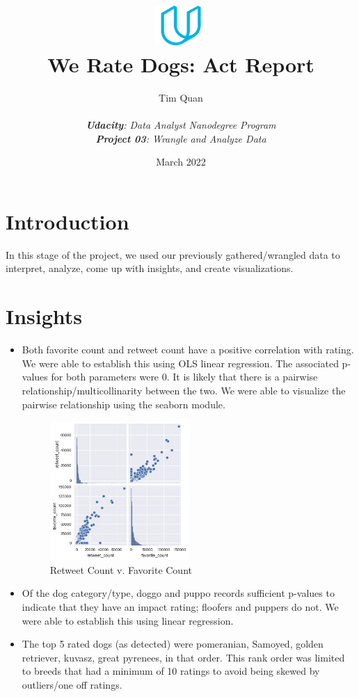 \documentclass[10pt,a4paper]{article}
\title{\includegraphics[width=2cm]{udacity-logo.png}\\We Rate Dogs: Act Report}
\date{March 2022}
\author{Tim Quan\\ \\ 
	\textit{\textbf{Udacity}: Data Analyst Nanodegree Program}\\ 
	\textit{\textbf{Project 03}: Wrangle and Analyze Data}}
\begin{document}
\maketitle

\section{Introduction}

    In this stage of the project, we used our previously gathered/wrangled data to interpret, analyze, come up with insights,
    and create visualizations.

    \section{Insights}
        \begin{itemize}

            \item Both favorite count and retweet count have a positive correlation with rating. We were able to establish this using OLS linear regression. 
            The associated p-values for both parameters were 0. It is likely that there is a pairwise relationship/multicollinarity between the two. We
            were able to visualize the pairwise relationship using the seaborn module.
            \begin{figure}[h]
                \centering
                \includegraphics[width=0.5\textwidth]{pairwise.jpg}            
                \caption{Retweet Count v. Favorite Count}
              \end{figure}
            \item Of the dog category/type, doggo and puppo records sufficient p-values to indicate that they have an impact rating; floofers and puppers do not.
            We were able to establish this using linear regression.
            \item The top 5 rated dogs (as detected) were pomeranian, Samoyed, golden retriever, kuvasz, great pyrenees, in that order. This rank order was limited to 
            breeds that had a minimum of 10 ratings to avoid being skewed by outliers/one off ratings.
        \end{itemize}
\end{document}
